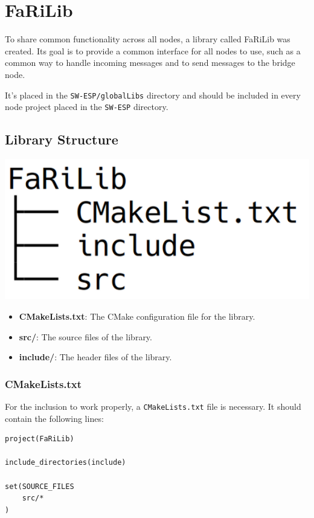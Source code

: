 \section{FaRiLib} \label{sec:farilib}
To share common functionality across all nodes, a library called FaRiLib was
created. Its goal is to provide a common interface for all nodes to use, such as
a common way to handle incoming messages and to send messages to the bridge node. 
\par\vspace{0.5em}
It's placed in the \texttt{SW-ESP/globalLibs} directory and should be included in
every node project placed in the \texttt{SW-ESP} directory.

    \subsection{Library Structure}
        \begin{minipage}{0.48\textwidth}
            \includegraphics[width=0.8\linewidth]{assets/FaRiLibStructure.png}
            \label{fig:farilib_structure}
        \end{minipage}%
        \begin{minipage}{0.48\textwidth}
            \raggedright
            \begin{itemize}
                \item \textbf{CMakeLists.txt}: The CMake configuration file for the 
                library.
                \item \textbf{src/}: The source files of the library.
                \item \textbf{include/}: The header files of the library.
            \end{itemize}
        \end{minipage}
        \subsubsection{CMakeLists.txt}
        For the inclusion to work properly, a \texttt{CMakeLists.txt} file is
        necessary. It should contain the following lines: 
    \begin{verbatim}
project(FaRiLib)

include_directories(include)

set(SOURCE_FILES
    src/*
)
    \end{verbatim}


